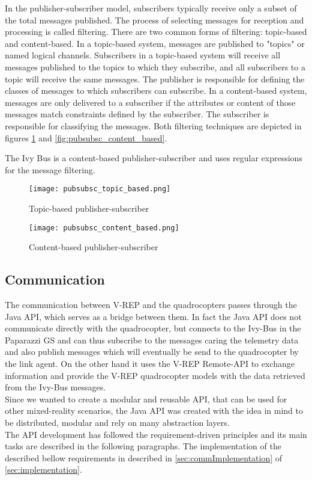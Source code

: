 In the publisher-subscriber model, subscribers typically receive only a subset of the total messages published. The process of selecting messages for reception and processing is called filtering. There are two common forms of filtering: topic-based and content-based.
In a topic-based system, messages are published to "topics" or named logical channels. Subscribers in a topic-based system will receive all messages published to the topics to which they subscribe, and all subscribers to a topic will receive the same messages. The publisher is responsible for defining the classes of messages to which subscribers can subscribe.
In a content-based system, messages are only delivered to a subscriber if the attributes or content of those messages match constraints defined by the subscriber. The subscriber is responsible for classifying the messages. Both filtering techniques are depicted in figures \ref{fig:pubsubsc_topic_based} and \ref{fig:pubsubsc_content_based}.

The Ivy Bus is a content-based publisher-subscriber and uses regular expressions for the message filtering.

\begin{figure}[!tbp]
  \centering
  \begin{minipage}[b]{0.4\textwidth}
    \texttt{[image: pubsubsc\_topic\_based.png]}
    \caption{Topic-based publisher-subscriber \label{fig:pubsubsc_content_based}}
  \end{minipage}
  \hfill
  \begin{minipage}[b]{0.4\textwidth}
    \texttt{[image: pubsubsc\_content\_based.png]}
    \caption{Content-based publisher-subscriber \label{fig:pubsubsc_topic_based}}
  \end{minipage}
\end{figure}

\subsection{Communication}
\label{sec:communication}

The communication between V-REP and the quadrocopters passes through the Java API, which serves as a bridge between them. In fact the Java API does not communicate directly with the quadrocopter, but connects to the Ivy-Bus in the Paparazzi GS and can thus subscribe to the messages caring the telemetry data and also publish messages which will eventually be send to the quadrocopter by the link agent. On the other hand it uses the V-REP Remote-API to exchange information and provide the V-REP quadrocopter models with the data retrieved from the Ivy-Bus messages.\\ 
Since we wanted to create a modular and reusable API, that can be used for other mixed-reality scenarios, the Java API was created with the idea in mind to be distributed, modular and rely on many abstraction layers.\\ 
The API development has followed the requirement-driven principles and its main tasks are described in the following paragraphs. The implementation of the described bellow requirements in described in \ref{sec:commImplementation} of \ref{sec:implementation}.


